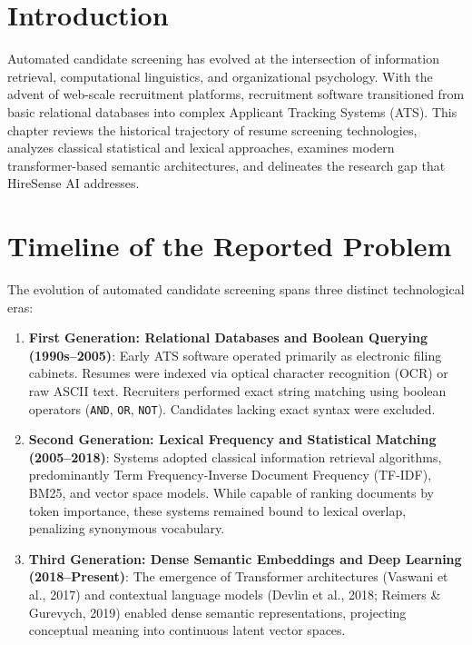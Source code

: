 \documentclass[12pt,a4paper]{report}
\begin{document}
\section{Introduction}
Automated candidate screening has evolved at the intersection of information retrieval, computational linguistics, and organizational psychology. With the advent of web-scale recruitment platforms, recruitment software transitioned from basic relational databases into complex Applicant Tracking Systems (ATS). This chapter reviews the historical trajectory of resume screening technologies, analyzes classical statistical and lexical approaches, examines modern transformer-based semantic architectures, and delineates the research gap that HireSense AI addresses.

\section{Timeline of the Reported Problem}
The evolution of automated candidate screening spans three distinct technological eras:
\begin{enumerate}
    \item \textbf{First Generation: Relational Databases and Boolean Querying (1990s--2005)}: Early ATS software operated primarily as electronic filing cabinets. Resumes were indexed via optical character recognition (OCR) or raw ASCII text. Recruiters performed exact string matching using boolean operators (\texttt{AND}, \texttt{OR}, \texttt{NOT}). Candidates lacking exact syntax were excluded.
    \item \textbf{Second Generation: Lexical Frequency and Statistical Matching (2005--2018)}: Systems adopted classical information retrieval algorithms, predominantly Term Frequency-Inverse Document Frequency (TF-IDF), BM25, and vector space models. While capable of ranking documents by token importance, these systems remained bound to lexical overlap, penalizing synonymous vocabulary.
    \item \textbf{Third Generation: Dense Semantic Embeddings and Deep Learning (2018--Present)}: The emergence of Transformer architectures (Vaswani et al., 2017) and contextual language models (Devlin et al., 2018; Reimers \& Gurevych, 2019) enabled dense semantic representations, projecting conceptual meaning into continuous latent vector spaces.
\end{enumerate}
\end{document}
